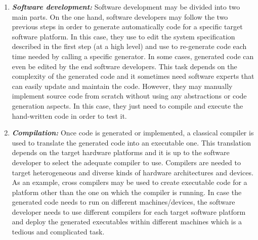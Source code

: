 \begin{enumerate}

\item \textbf{\textit{Software development:}}
Software development may be divided into two main parts. On the one hand, software developers may follow the two previous steps in order to generate automatically code for a specific target software platform. In this case, they use to edit the system specification described in the first step (at a high level) and use to re-generate code each time needed by calling a specific generator. In some cases, generated code can even be edited by the end software developers. This task depends on the complexity of the generated code and it sometimes need software experts that can easily update and maintain the code. However, they may manually implement source code from scratch without using any abstractions or code generation aspects. In this case, they just need to compile and execute the hand-written code in order to test it.

\item \textbf{\textit{Compilation:}}
Once code is generated or implemented, a classical compiler is used to translate the generated code into an executable one. This translation depends on the target hardware platforms and it is up to the software developer to select the adequate compiler to use. Compilers are needed to target heterogeneous and diverse kinds of hardware architectures and devices. 
As an example, cross compilers may be used to create executable code for a platform other than the one on which the compiler is running. In case the generated code needs to run on different machines/devices, the software developer needs to use different compilers for each target software platform and deploy the generated executables within different machines which is a tedious and complicated task.

\end{enumerate} 



